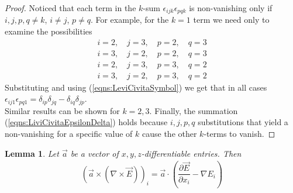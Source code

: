 \documentclass[12pt,twoside]{report}
\newtheorem{lem}{Lemma}[subsubsection]
\begin{document}
\begin{appendices}
\begin{proof}
Noticed that each term in the $k$-sum $\epsilon_{ijk} \epsilon_{pqk}$ is non-vanishing only if $i,j,p,q \neq k$, $i \neq j$, $p \neq q$. For example, for the $k=1$ term we need only to examine the possibilities 
\begin{align*}
i=2,\quad j=3, \quad p=2, \quad q=3	\\
i=3,\quad j=2, \quad p=2, \quad q=3	\\
i=2,\quad j=3, \quad p=3, \quad q=2	\\
i=3,\quad j=2, \quad p=3, \quad q=2
\end{align*} 
Substituting and using (\ref{eqns:LeviCivitaSymbol}) we get that in all cases  $\epsilon_{ij1} \epsilon_{pq1} =  \delta_{ip} \delta_{jq} - \delta_{iq} \delta_{jp}$.\\
Similar results can be shown for $k=2,3$. Finally, the summation (\ref{eqns:LiviCivitaEpsilonDelta}) holds because $i,j,p,q$ substitutions that yield a non-vanishing for a specific value of $k$ cause the other $k$-terms to vanish.
\end{proof}

\begin{lem}
Let $\overrightarrow{a}$ be a vector of $x,y,z$-differentiable entries. Then 
\begin{align}
\label{eqns:doubleCrossProdDecomposition}
\left( \overrightarrow{a} \times (\nabla \times \overrightarrow{E}) \right)_i = \overrightarrow{a} \cdot \left( \dfrac{\partial \overrightarrow{E}}{\partial x_i}- \nabla E_i \right)
\end{align}
\end{lem}


\end{appendices}
\end{document}
